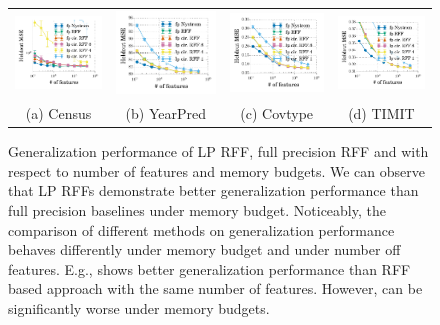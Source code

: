 \begin{figure}
\begin{tabular}{@{\hskip 0in}c@{\hskip 0in}c@{\hskip 0in}c@{\hskip 0in}c@{\hskip 0in}}
		\includegraphics[width=0.26\linewidth]{figures/census_MSE_vs_n_feat_all_line.pdf} &
		\includegraphics[width=0.26\linewidth]{figures/yearpred_MSE_vs_n_feat_all_line.pdf} &
		\includegraphics[width=0.26\linewidth]{figures/covtype_error_vs_n_feat_all_line.pdf} &
		\includegraphics[width=0.26\linewidth]{figures/timit_error_vs_n_feat_all_line.pdf} \\
		(a) Census & (b) YearPred & (c) Covtype & (d) TIMIT \\
	\end{tabular}
	\caption{Generalization performance of LP RFF, full precision RFF and \Nystrom with respect to number of features and memory budgets. We can observe that LP RFFs demonstrate better generalization performance than full precision baselines under memory budget. Noticeably, the comparison of different methods on generalization performance behaves differently under memory budget and under number off features. E.g., \Nystrom shows better generalization performance than RFF based approach with the same number of features. However, \Nystrom can be significantly worse under memory budgets.}
	\label{fig:generalization_col_app}
\end{figure}

